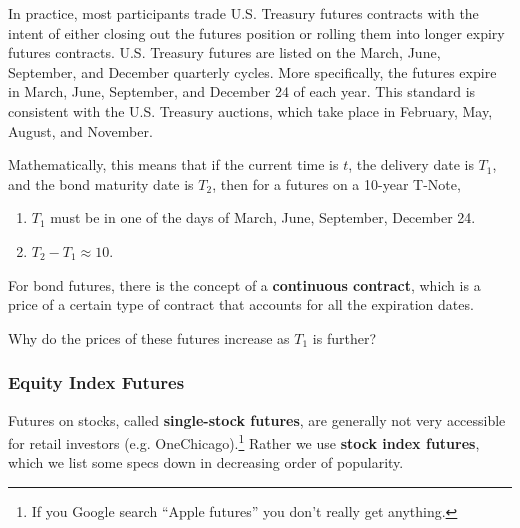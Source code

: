 \documentclass{article}
\begin{document}
      In practice, most participants trade U.S. Treasury futures contracts with the intent of either closing out the futures position or rolling them into longer expiry futures contracts. U.S. Treasury futures are listed on the March, June, September, and December quarterly cycles. More specifically, the futures expire in March, June, September, and December 24 of each year. This standard is consistent with the U.S. Treasury auctions, which take place in February, May, August, and November. 

      \begin{example}
        Mathematically, this means that if the current time is $t$, the delivery date is $T_1$, and the bond maturity date is $T_2$, then for a futures on a 10-year T-Note, 
        \begin{enumerate}
          \item $T_1$ must be in one of the days of March, June, September, December 24. 
          \item $T_2 - T_1 \approx 10$. 
        \end{enumerate}
      \end{example}

      For bond futures, there is the concept of a \textbf{continuous contract}, which is a price of a certain type of contract that accounts for all the expiration dates. 

      \begin{question}
        Why do the prices of these futures increase as $T_1$ is further? 
      \end{question}

    \subsubsection{Equity Index Futures}

      Futures on stocks, called \textbf{single-stock futures}, are generally not very accessible for retail investors (e.g. OneChicago).\footnote{If you Google search ``Apple futures'' you don't really get anything. } Rather we use \textbf{stock index futures}, which we list some specs down in decreasing order of popularity. 
\end{document}

